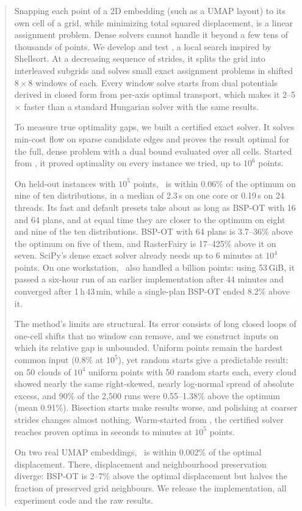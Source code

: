 \begin{abstract}
Snapping each point of a 2D embedding (such as a UMAP layout) to its own cell of a grid,
while minimizing total squared displacement, is a linear assignment problem. Dense solvers
cannot handle it beyond a few tens of thousands of points. We develop and test
\ShuffleSnap, a local search inspired by Shellsort. At a decreasing sequence of strides, it
splits the grid into interleaved subgrids and solves small exact assignment problems in
shifted $8\times8$ windows of each. Every window solve starts from dual potentials derived
in closed form from per-axis optimal transport, which makes it 2--5$\times$ faster than a
standard Hungarian solver with the same results.

To measure true optimality gaps, we built a certified exact solver. It solves min-cost flow
on sparse candidate edges and proves the result optimal for the full, dense problem with a
dual bound evaluated over all cells. Started from \ShuffleSnap, it proved optimality on
every instance we tried, up to $10^6$ points.

On held-out instances with $10^5$ points, \ShuffleSnap\ is within 0.06\% of the optimum on
nine of ten distributions, in a median of 2.3\,s on one core or 0.19\,s on 24 threads.
Its fast and default presets take about as long as BSP-OT with 16 and 64 plans, and at equal
time they are closer to the optimum on eight and nine of the ten distributions. BSP-OT with
64 plans is 3.7--36\% above the optimum on five of them, and RasterFairy is 17--425\% above it
on seven. SciPy's dense exact solver already needs up to 6 minutes at $10^4$ points. On one
workstation, \ShuffleSnap\ also handled a billion points: using 53\,GiB, it passed a six-hour
run of an earlier implementation after 44 minutes and converged after 1\,h\,43\,min, while a
single-plan BSP-OT ended 8.2\% above it.

The method's limits are structural. Its error consists of long closed loops of one-cell
shifts that no window can remove, and we construct inputs on which its relative gap is
unbounded. Uniform points remain the hardest common input (0.8\% at $10^5$), yet random starts give a
predictable result: on 50 clouds of $10^4$ uniform points with 50 random starts each, every
cloud showed nearly the same right-skewed, nearly log-normal spread of absolute excess, and
90\% of the 2{,}500 runs were 0.55--1.38\% above the optimum (mean 0.91\%).
Bisection starts make results worse, and polishing at coarser strides changes almost
nothing. Warm-started from \ShuffleSnap, the certified solver reaches proven optima in
seconds to minutes at $10^5$ points.

On two real UMAP embeddings, \ShuffleSnap\ is within 0.002\% of the optimal displacement.
There, displacement and neighbourhood preservation diverge: BSP-OT is 2--7\% above the
optimal displacement but halves the fraction of preserved grid neighbours. We release the
implementation, all experiment code and the raw results.
\end{abstract}
